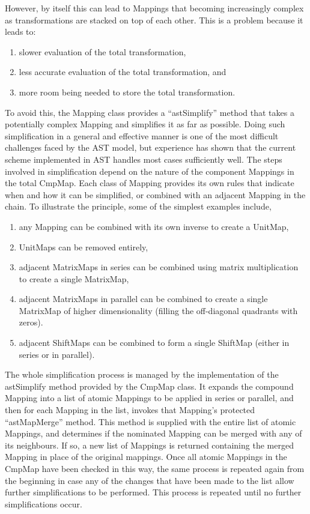 \documentclass[final,authoryear,5p,times,twocolumn]{elsarticle}
\begin{document}
However, by itself this can lead to Mappings that becoming increasingly
complex as transformations are stacked on top of each other. This is
a problem because it leads to:

\begin{enumerate}
\item slower evaluation of the total transformation,
\item less accurate evaluation of the total transformation, and
\item more room being needed to store the total transformation.
\end{enumerate}

To avoid this, the Mapping class provides a ``astSimplify'' method that
takes a potentially complex Mapping and simplifies it as far as possible.
Doing such simplification in a general and effective manner is one of the
most difficult challenges faced by the AST model, but experience has shown
that the current scheme implemented in AST handles most cases sufficiently
well. The steps involved in simplification depend on the nature of the
component Mappings in the total CmpMap. Each class of Mapping provides its
own rules that indicate when and how it can be simplified, or combined
with an adjacent Mapping in the chain. To illustrate the principle,
some of the simplest examples include,

\begin{enumerate}
\item any Mapping can be combined with its own inverse to create a UnitMap,
\item UnitMaps can be removed entirely,
\item adjacent MatrixMaps in series can be combined using matrix
multiplication to create a single MatrixMap,
\item adjacent MatrixMaps in parallel can be combined to create a
single MatrixMap of higher dimensionality (filling the off-diagonal
quadrants with zeros).
\item adjacent ShiftMaps can be combined to form a single ShiftMap
(either in series or in parallel).
\end{enumerate}

The whole simplification process is managed by the implementation of the
astSimplify method provided by the CmpMap class. It expands the compound
Mapping into a list of atomic Mappings to be applied in series or
parallel, and then for each Mapping in the list, invokes that Mapping’s
protected ``astMapMerge'' method. This method is supplied with the entire
list of atomic Mappings, and determines if the nominated Mapping can be
merged with any of its neighbours. If so, a new list of Mappings is
returned containing the merged Mapping in place of the original mappings.
Once all atomic Mappings in the CmpMap have been checked in this way, the
same process is repeated again from the beginning in case any of the
changes that have been made to the list allow further simplifications to
be performed. This process is repeated until no further simplifications
occur.
\end{document}
